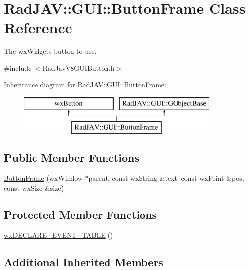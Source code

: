 \hypertarget{class_rad_j_a_v_1_1_g_u_i_1_1_button_frame}{}\section{Rad\+J\+AV\+:\+:G\+UI\+:\+:Button\+Frame Class Reference}
\label{class_rad_j_a_v_1_1_g_u_i_1_1_button_frame}


The wx\+Widgets button to use.  




{\ttfamily \#include $<$Rad\+Jav\+V8\+G\+U\+I\+Button.\+h$>$}

Inheritance diagram for Rad\+J\+AV\+:\+:G\+UI\+:\+:Button\+Frame\+:\begin{figure}[H]
\begin{center}
\leavevmode
\includegraphics[height=2.000000cm]{class_rad_j_a_v_1_1_g_u_i_1_1_button_frame}
\end{center}
\end{figure}
\subsection*{Public Member Functions}
\begin{DoxyCompactItemize}
\item 
\mbox{\hyperlink{class_rad_j_a_v_1_1_g_u_i_1_1_button_frame_aafb4caa253aab35934c3f53f72f33021}{Button\+Frame}} (wx\+Window $\ast$parent, const wx\+String \&text, const wx\+Point \&pos, const wx\+Size \&size)
\end{DoxyCompactItemize}
\subsection*{Protected Member Functions}
\begin{DoxyCompactItemize}
\item 
\mbox{\hyperlink{class_rad_j_a_v_1_1_g_u_i_1_1_button_frame_ab4bf43d2e0d153e4854cae3566bd6794}{wx\+D\+E\+C\+L\+A\+R\+E\+\_\+\+E\+V\+E\+N\+T\+\_\+\+T\+A\+B\+LE}} ()
\end{DoxyCompactItemize}
\subsection*{Additional Inherited Members}


